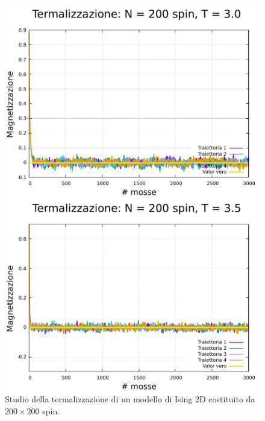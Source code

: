 \begin{figure}[htbp]
    \begin{minipage}{0.45\textwidth}  
        \centering
        \includegraphics[page=1, width=\textwidth]{Immagini/simIsing2D/metro/term/term_200_3.0.pdf}
        \caption{$T\,=\,3.0$}
      \end{minipage}\hfill
      \begin{minipage}{0.45\textwidth}  
        \centering
        \includegraphics[page=1, width=\textwidth]{Immagini/simIsing2D/metro/term/term_200_3.5.pdf}
        \caption{$T\,=\,3.5$}
    \end{minipage}

    \caption{Studio della termalizzazione di un modello di Ising 2D costituito da $200 \times 200$ spin.}
\end{figure}

